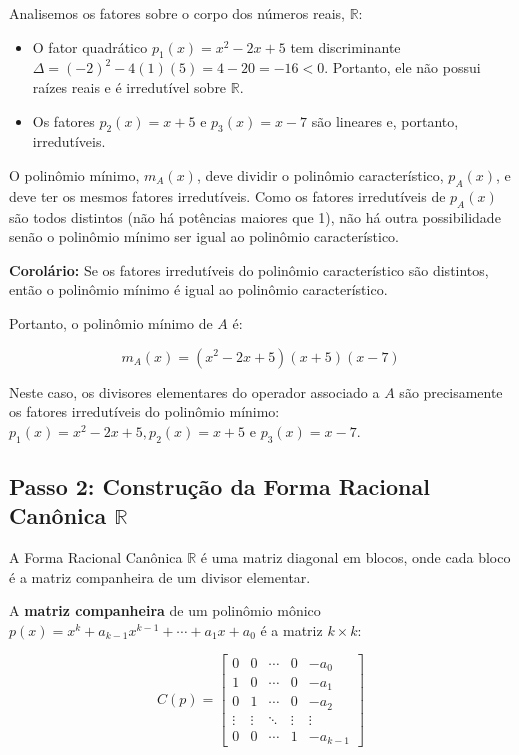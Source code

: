 Analisemos os fatores sobre o corpo dos números reais, $\mathbb{R}$:

\begin{itemize}
\item O fator quadrático $p_1(x) = x^2 - 2x + 5$ tem discriminante $\Delta = (-2)^2 - 4(1)(5) = 4 - 20 = -16 < 0$. Portanto, ele não possui raízes reais e é irredutível sobre $\mathbb{R}$.
\item Os fatores $p_2(x) = x+5$ e $p_3(x) = x-7$ são lineares e, portanto, irredutíveis.
\end{itemize}

O polinômio mínimo, $m_A(x)$, deve dividir o polinômio característico, $p_A(x)$, e deve ter os mesmos
fatores irredutíveis. Como os fatores irredutíveis de $p_A(x)$ são todos distintos (não há potências
maiores que 1), não há outra possibilidade senão o polinômio mínimo ser igual ao polinômio
característico.

\textbf{Corolário:} Se os fatores irredutíveis do polinômio característico são distintos, então o polinômio
mínimo é igual ao polinômio característico.

Portanto, o polinômio mínimo de $A$ é:

\[
m_A(x) = (x^2 - 2x + 5)(x+5)(x-7)
\]

Neste caso, os divisores elementares do operador associado a $A$ são precisamente os fatores
irredutíveis do polinômio mínimo: $p_1(x) = x^2 - 2x + 5, p_2(x) = x+5$ e $p_3(x) = x-7$.

\subsection*{Passo 2: Construção da Forma Racional Canônica $\mathbb{R}$}

A Forma Racional Canônica $\mathbb{R}$ é uma matriz diagonal em blocos, onde cada bloco é a matriz
companheira de um divisor elementar.

A \textbf{matriz companheira} de um polinômio mônico $p(x) = x^k + a_{k-1}x^{k-1} + \cdots + a_1x + a_0$ é a
matriz $k\times k$:

\[
C(p) =
\begin{bmatrix}
0 & 0 & \cdots & 0 & -a_0 \\
1 & 0 & \cdots & 0 & -a_1 \\
0 & 1 & \cdots & 0 & -a_2 \\
\vdots & \vdots & \ddots & \vdots & \vdots \\
0 & 0 & \cdots & 1 & -a_{k-1}
\end{bmatrix}
\]

